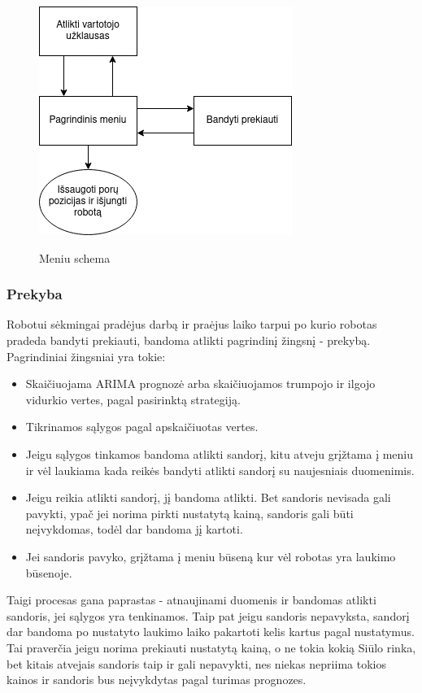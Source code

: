 \documentclass{VUMIFInfKursinis}
\begin{document}
\begin{figure}[H]
  \centering
  \includegraphics[width=.5\textwidth]{img/meniu.png}
  \label{fig:meniu_flowchart}
  \caption{Meniu schema}
\end{figure}

\subsubsection{Prekyba}
Robotui sėkmingai pradėjus darbą ir praėjus laiko tarpui po kurio robotas pradeda bandyti prekiauti, bandoma atlikti pagrindinį žingsnį - prekybą.
Pagrindiniai žingsniai yra tokie:
\begin{itemize}
  \item Skaičiuojama ARIMA prognozė arba skaičiuojamos trumpojo ir ilgojo vidurkio vertes, pagal pasirinktą strategiją.
  \item Tikrinamos sąlygos pagal apskaičiuotas vertes.
  \item Jeigu sąlygos tinkamos bandoma atlikti sandorį, kitu atveju grįžtama į meniu ir vėl laukiama kada reikės bandyti atlikti sandorį su naujesniais duomenimis.
  \item Jeigu reikia atlikti sandorį, jį bandoma atlikti. Bet sandoris nevisada gali pavykti, ypač jei norima pirkti nustatytą kainą, sandoris gali būti neįvykdomas, todėl dar bandoma jį kartoti.
  \item Jei sandoris pavyko, grįžtama į meniu būseną kur vėl robotas yra laukimo būsenoje.
\end{itemize}

Taigi procesas gana paprastas - atnaujinami duomenis ir bandomas atlikti sandoris, jei sąlygos yra tenkinamos. Taip pat jeigu sandoris nepavyksta, sandorį
dar bandoma po nustatyto laukimo laiko pakartoti kelis kartus pagal nustatymus. Tai praverčia jeigu norima prekiauti nustatytą kainą, o ne tokia kokią Siūlo 
rinka, bet kitais atvejais sandoris taip ir gali nepavykti, nes niekas nepriima tokios kainos ir sandoris bus neįvykdytas pagal turimas prognozes.
\end{document}
